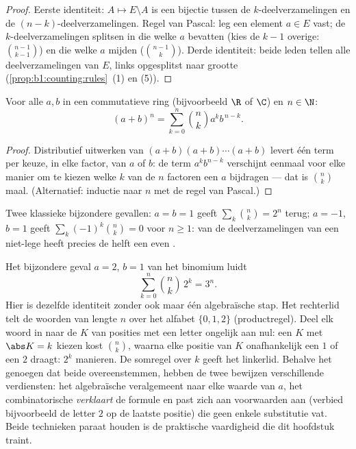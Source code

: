 \begin{proof}
Eerste identiteit: $A \mapsto E \setminus A$ is een bijectie tussen de
$k$-deelverzamelingen en de $(n-k)$-deelverzamelingen. Regel van
Pascal: leg een element $a \in E$ vast; de
$k$-deelverzamelingen splitsen in die welke $a$ bevatten (kies de $k -
1$ overige: $\binom{n-1}{k-1}$) en die welke $a$ mijden
($\binom{n-1}{k}$). Derde identiteit: beide leden tellen alle
deelverzamelingen van $E$, links opgesplitst naar grootte
(\cref{prop:b1:counting:rules}~(1) en (5)).
\end{proof}

\begin{theorem}\label{thm:b1:counting:binomial}
Voor alle $a, b$ in een commutatieve ring (bijvoorbeeld $\R$ of $\C$) en
$n \in \N$:
\[
(a + b)^n = \sum_{k=0}^{n} \binom{n}{k} a^k b^{\,n-k} .
\]
\end{theorem}

\begin{proof}
Distributief uitwerken van $(a+b)(a+b)\cdots(a+b)$ levert één term per
keuze, in elke factor, van $a$ of $b$: de term $a^k b^{n-k}$ verschijnt
eenmaal voor elke manier om te kiezen welke $k$ van de $n$ factoren een
$a$ bijdragen --- dat is $\binom nk$ maal. (Alternatief: inductie naar
$n$ met de regel van Pascal.)
\end{proof}

\begin{example}\label{ex:b1:counting:binomial}
Twee klassieke bijzondere gevallen: $a = b = 1$ geeft $\sum_k \binom nk
= 2^n$ terug; $a = -1$, $b = 1$ geeft $\sum_{k} (-1)^k \binom nk = 0$
voor $n \geq 1$: van de deelverzamelingen van een niet-lege 
heeft precies de helft een even .
\end{example}

\begin{example}\label{ex:b1:counting:threen}
Het bijzondere geval $a = 2$, $b = 1$ van het binomium luidt
\[
\sum_{k=0}^{n} \binom nk\,2^k = 3^n .
\]
Hier is dezelfde identiteit zonder ook maar één algebraïsche stap.
Het rechterlid telt de woorden van lengte $n$ over het alfabet $\{0,
1, 2\}$ (productregel). Deel elk woord in naar de  $K$
van posities met een letter ongelijk aan nul: een $K$ met $\abs K =
k$ kiezen kost $\binom nk$, waarna elke positie van $K$ onafhankelijk
een $1$ of een $2$ draagt: $2^k$ manieren. De somregel over $k$ geeft
het linkerlid. Behalve het genoegen dat beide overeenstemmen, hebben
de twee bewijzen verschillende verdiensten: het algebraïsche
veralgemeent naar elke waarde van $a$, het combinatorische
\emph{verklaart} de formule en past zich aan voorwaarden aan
(verbied bijvoorbeeld de letter $2$ op de laatste positie) die geen
enkele substitutie vat. Beide technieken paraat houden is de
praktische vaardigheid die dit hoofdstuk traint.
\end{example}

